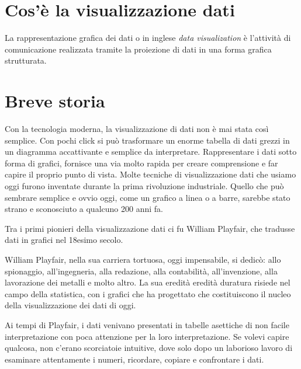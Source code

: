 \setlength{\parskip}{1em}

\section{Cos'è la visualizzazione dati }
La rappresentazione grafica dei dati o in inglese \emph{data visualization} è l’attività di comunicazione realizzata tramite la proiezione di dati in una forma grafica strutturata.

\section{Breve storia}

Con la tecnologia moderna, la visualizzazione di dati non è mai stata così semplice.
Con pochi click si può trasformare un enorme tabella di dati grezzi in un diagramma accattivante e semplice da interpretare. Rappresentare i dati sotto forma di grafici, fornisce una via molto rapida per creare comprensione e far capire il proprio punto di vista.
Molte tecniche di visualizzazione dati che usiamo oggi furono inventate durante la prima rivoluzione industriale.
Quello che può sembrare semplice e ovvio oggi, come un grafico a linea o a barre,  sarebbe stato strano e sconosciuto a qualcuno 200 anni fa.


\noindent Tra i primi pionieri della visualizzazione dati ci fu William Playfair, che tradusse dati in grafici nel 18esimo secolo. 

\noindent William Playfair, nella sua carriera tortuosa, oggi impensabile, si dedicò: allo spionaggio, all’ingegneria, alla redazione, alla contabilità, all’invenzione, alla lavorazione dei metalli e molto altro. La sua eredità eredità duratura risiede nel campo della statistica, con i grafici che ha progettato che costituiscono il nucleo della visualizzazione dei dati di oggi.

\noindent Ai tempi di Playfair, i dati venivano presentati in tabelle asettiche di non facile interpretazione con poca attenzione per la loro interpretazione. Se volevi capire qualcosa, non c’erano scorciatoie intuitive, dove solo dopo un laborioso lavoro di esaminare attentamente i numeri, ricordare, copiare e confrontare i dati.


